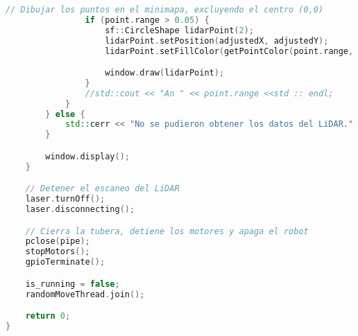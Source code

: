 \begin{lstlisting}[language={C++}, caption={Tercer ajuste de c\'odigo}, label={TercerAjuste}]
                // Dibujar los puntos en el minimapa, excluyendo el centro (0,0)
                if (point.range > 0.05) {
                    sf::CircleShape lidarPoint(2);
                    lidarPoint.setPosition(adjustedX, adjustedY);
                    lidarPoint.setFillColor(getPointColor(point.range, max_range));

                    window.draw(lidarPoint);
                }
                //std::cout << "An " << point.range <<std :: endl;
            }
        } else {
            std::cerr << "No se pudieron obtener los datos del LiDAR." << std::endl;
        }

        window.display();
    }

    // Detener el escaneo del LiDAR
    laser.turnOff();
    laser.disconnecting();

    // Cierra la tubera, detiene los motores y apaga el robot
    pclose(pipe);
    stopMotors();
    gpioTerminate();

    is_running = false;
    randomMoveThread.join();

    return 0;
}
    \end{lstlisting}